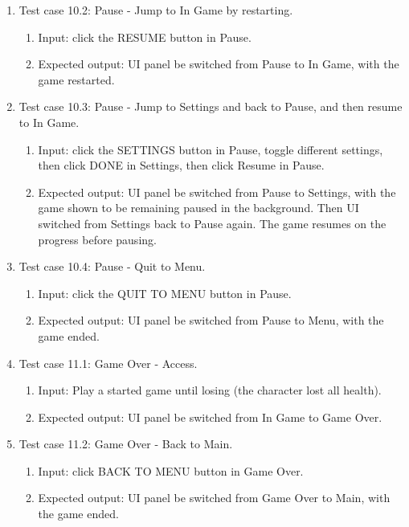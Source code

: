 \documentclass[11pt]{article}
\begin{document}
\begin{enumerate}
        \item Test case 10.2: Pause - Jump to In Game by restarting.
        \begin{enumerate}
            \item  Input: click the RESUME button in Pause.
            \item  Expected output: UI panel be switched from Pause to In Game, with the game restarted.
        \end{enumerate}
        \item Test case 10.3: Pause - Jump to Settings and back to Pause, and then resume to In Game.
        \begin{enumerate}
            \item  Input: click the SETTINGS button in Pause, toggle different settings, then click DONE in Settings, then click Resume in Pause.
            \item  Expected output: UI panel be switched from Pause to Settings, with the game shown to be remaining paused in the background. Then UI switched from Settings back to Pause again. The game resumes on the progress before pausing.
        \end{enumerate}
        \item Test case 10.4: Pause - Quit to Menu.
        \begin{enumerate}
            \item  Input: click the QUIT TO MENU button in Pause.
            \item  Expected output: UI panel be switched from Pause to Menu, with the game ended.
        \end{enumerate}
        \item Test case 11.1: Game Over - Access.
        \begin{enumerate}
            \item  Input: Play a started game until losing (the character lost all health).
            \item  Expected output: UI panel be switched from In Game to Game Over.
        \end{enumerate}
        \item Test case 11.2: Game Over - Back to Main.
        \begin{enumerate}
            \item  Input: click BACK TO MENU button in Game Over.
            \item  Expected output: UI panel be switched from Game Over to Main, with the game ended.
        \end{enumerate}

\end{enumerate}
\end{document}
